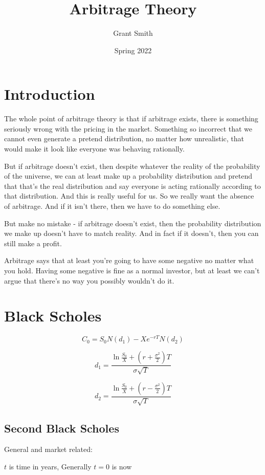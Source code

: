 \documentclass{article}
\title{Arbitrage Theory}
\author{Grant Smith}
\date{Spring 2022}
\begin{document}
\maketitle

\section{Introduction}

The whole point of arbitrage theory is that if arbitrage exists, there is something seriously wrong with the pricing in the market. Something so incorrect that we cannot even generate a pretend distribution, no matter how unrealistic, that would make it look like everyone was behaving rationally. 

But if arbitrage doesn't exist, then despite whatever the reality of the probability of the universe, we can at least make up a probability distribution and pretend that that's the real distribution and say everyone is acting rationally according to that distribution. And this is really useful for us.  So we really want the absence of arbitrage. And if it isn't there, then we have to do something else. 

But make no mistake - if arbitrage doesn't exist, then the probability distribution we make up doesn't have to match reality. And in fact if it doesn't, then you can still make a profit. 

Arbitrage says that at least you're going to have some negative no matter what you hold. Having some negative is fine as a normal investor, but at least we can't argue that there's no way you possibly wouldn't do it.

\section{Black Scholes}

$$C_0 = S_0 N(d_1) - Xe^{-rT}N(d_2)$$

$$d_1 = \frac{\ln \frac{S_0}{X} + (r + \frac{\sigma^2}{2})T}{\sigma \sqrt{T}}$$

$$d_2 = \frac{\ln \frac{S_0}{X} + (r - \frac{\sigma^2}{2})T}{\sigma \sqrt{T}}$$

\subsection{Second Black Scholes}

General and market related:

$t$ is time in years, Generally $t=0$ is now
\end{document}
